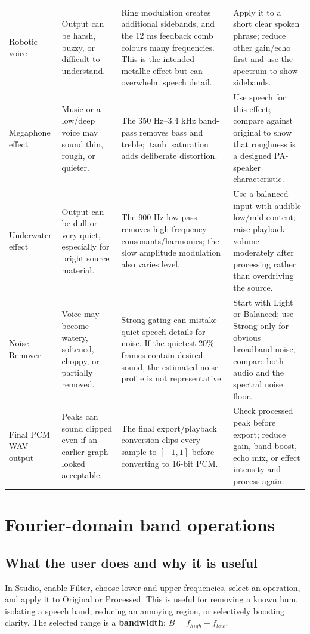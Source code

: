 \documentclass[11pt,a4paper]{article}
\newcommand{\term}[1]{\textbf{#1}}
\begin{document}
{\begin{longtable}{@{}p{.19\linewidth}p{.23\linewidth}p{.32\linewidth}p{.18\linewidth}@{}}
Robotic voice & Output can be harsh, buzzy, or difficult to understand. & Ring modulation creates additional sidebands, and the 12 ms feedback comb colours many frequencies. This is the intended metallic effect but can overwhelm speech detail. & Apply it to a short clear spoken phrase; reduce other gain/echo first and use the spectrum to show sidebands.\\

Megaphone effect & Music or a low/deep voice may sound thin, rough, or quieter. & The 350 Hz--3.4 kHz band-pass removes bass and treble; \(\tanh\) saturation adds deliberate distortion. & Use speech for this effect; compare against original to show that roughness is a designed PA-speaker characteristic.\\

Underwater effect & Output can be dull or very quiet, especially for bright source material. & The 900 Hz low-pass removes high-frequency consonants/harmonics; the slow amplitude modulation also varies level. & Use a balanced input with audible low/mid content; raise playback volume moderately after processing rather than overdriving the source.\\

Noise Remover & Voice may become watery, softened, choppy, or partially removed. & Strong gating can mistake quiet speech details for noise. If the quietest 20\% frames contain desired sound, the estimated noise profile is not representative. & Start with Light or Balanced; use Strong only for obvious broadband noise; compare both audio and the spectral noise floor.\\

Final PCM WAV output & Peaks can sound clipped even if an earlier graph looked acceptable. & The final export/playback conversion clips every sample to \([-1,1]\) before converting to 16-bit PCM. & Check processed peak before export; reduce gain, band boost, echo mix, or effect intensity and process again.\\
\end{longtable}
}

\section{Fourier-domain band operations}
\subsection{What the user does and why it is useful}
In Studio, enable Filter, choose lower and upper frequencies, select an operation, and apply it to Original or Processed. This is useful for removing a known hum, isolating a speech band, reducing an annoying region, or selectively boosting clarity. The selected range is a \term{bandwidth}: \(B=f_{high}-f_{low}\).
\end{document}
